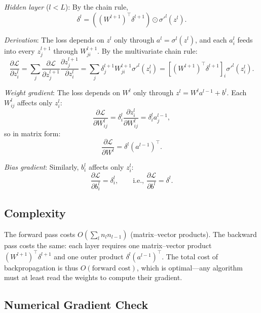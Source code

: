 \emph{Hidden layer} ($l < L$): By the chain rule,
\[
\delta^l = \left( (W^{l+1})^\top \delta^{l+1} \right) \odot \sigma'^l(z^l).
\]

\emph{Derivation}: The loss depends on $z^l$ only through $a^l =
\sigma^l(z^l)$, and each $a^l_i$ feeds into every $z^{l+1}_j$ through
$W^{l+1}_{ji}$. By the multivariate chain rule:
\[
\frac{\partial \mathcal{L}}{\partial z^l_i} = \sum_j \frac{\partial \mathcal{L}}{\partial z^{l+1}_j} \frac{\partial z^{l+1}_j}{\partial z^l_i} = \sum_j \delta^{l+1}_j W^{l+1}_{ji} \sigma'^l(z^l_i) = \left[ (W^{l+1})^\top \delta^{l+1} \right]_i \sigma'^l(z^l_i).
\]

\emph{Weight gradient}: The loss depends on $W^l$ only through $z^l =
W^l a^{l-1} + b^l$. Each $W^l_{ij}$ affects only $z^l_i$:
\[
\frac{\partial \mathcal{L}}{\partial W^l_{ij}} = \delta^l_i \frac{\partial z^l_i}{\partial W^l_{ij}} = \delta^l_i a^{l-1}_j,
\]
so in matrix form:
\[
\frac{\partial \mathcal{L}}{\partial W^l} = \delta^l (a^{l-1})^\top.
\]

\emph{Bias gradient}: Similarly, $b^l_i$ affects only $z^l_i$:
\[
\frac{\partial \mathcal{L}}{\partial b^l_i} = \delta^l_i, \qquad \text{i.e., } \frac{\partial \mathcal{L}}{\partial b^l} = \delta^l.
\]

\subsection{Complexity}

The forward pass costs $O(\sum_l n_l n_{l-1})$ (matrix--vector
products). The backward pass costs the same: each layer requires one
matrix--vector product $(W^{l+1})^\top \delta^{l+1}$ and one outer
product $\delta^l (a^{l-1})^\top$. The total cost of backpropagation
is thus $O(\text{forward cost})$, which is optimal---any algorithm must
at least read the weights to compute their gradient.


\subsection{Numerical Gradient Check}

